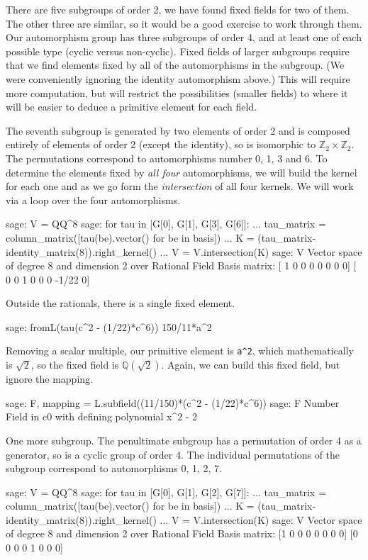 %
There are five subgroups of order 2, we have found fixed fields for two of them.  The other three are similar, so it would be a good exercise to work through them.  Our automorphism group has three subgroups of order 4, and at least one of each possible type (cyclic versus non-cyclic).  Fixed fields of larger subgroups require that we find elements fixed by all of the automorphisms in the subgroup.  (We were conveniently ignoring the identity automorphism above.)  This will require more computation, but will restrict the possibilities (smaller fields) to where it will be easier to deduce a primitive element for each field.\par
%
The seventh subgroup is generated by two elements of order 2 and is composed entirely of elements of order 2 (except the identity), so is isomorphic to ${\mathbb Z}_2\times{\mathbb Z}_2$.  The permutations correspond to automorphisms number 0, 1, 3 and 6.  To determine the elements fixed by \emph{all four} automorphisms, we will build the kernel for each one and as we go form the \emph{intersection} of all four kernels.  We will work via a loop over the four automorphisms.
%
\begin{sageexample}
sage: V = QQ^8
sage: for tau in [G[0], G[1], G[3], G[6]]:
...     tau_matrix = column_matrix([tau(be).vector() for be in basis])
...     K = (tau_matrix-identity_matrix(8)).right_kernel()
...     V = V.intersection(K)
sage: V
Vector space of degree 8 and dimension 2 over Rational Field
Basis matrix:
[    1     0     0     0     0     0     0     0]
[    0     0     1     0     0     0 -1/22     0]
\end{sageexample}
%
Outside the rationals, there is a single fixed element.
%
\begin{sageexample}
sage: fromL(tau(c^2 - (1/22)*c^6))
150/11*a^2
\end{sageexample}
%
Removing a scalar multiple, our primitive element is \verb?a^2?, which mathematically is $\sqrt{2}$, so the fixed field is ${\mathbb Q}(\sqrt{2})$.  Again, we can build this fixed field, but ignore the mapping.
%
\begin{sageexample}
sage: F, mapping = L.subfield((11/150)*(c^2 - (1/22)*c^6))
sage: F
Number Field in c0 with defining polynomial x^2 - 2
\end{sageexample}
%
One more subgroup.  The penultimate subgroup has a permutation of order 4 as a generator, so is a cyclic group of order 4.  The individual permutations of the subgroup correspond to automorphisms 0, 1, 2, 7.
%
\begin{sageexample}
sage: V = QQ^8
sage: for tau in [G[0], G[1], G[2], G[7]]:
...     tau_matrix = column_matrix([tau(be).vector() for be in basis])
...     K = (tau_matrix-identity_matrix(8)).right_kernel()
...     V = V.intersection(K)
sage: V
Vector space of degree 8 and dimension 2 over Rational Field
Basis matrix:
[1 0 0 0 0 0 0 0]
[0 0 0 0 1 0 0 0]
\end{sageexample}
